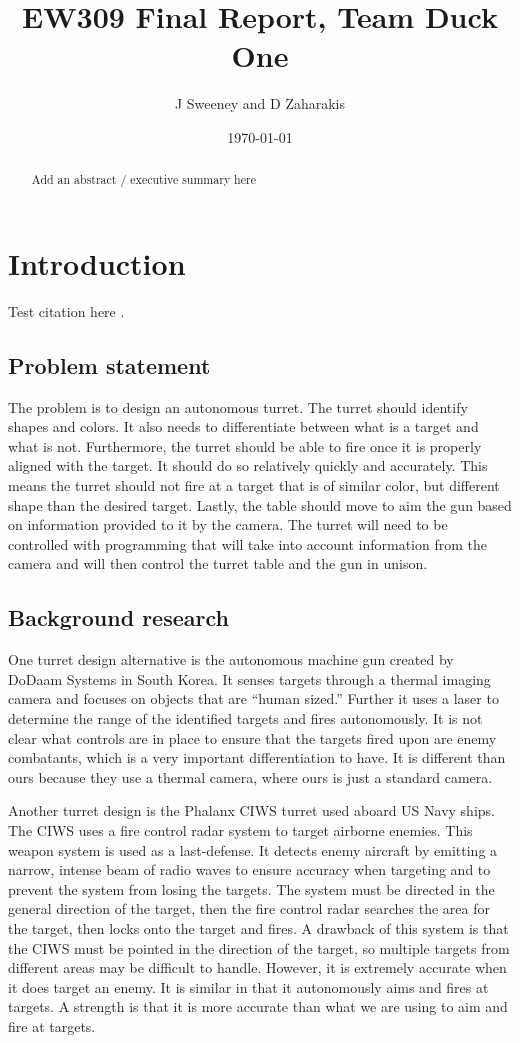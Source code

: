 \documentclass{article}
\title{EW309 Final Report, Team Duck One}
\author{J Sweeney and D Zaharakis}
\date{\today}
\begin{document}
\maketitle
\begin{abstract}
Add an abstract / executive summary here
\end{abstract}

\section{Introduction}
Test citation here \cite{buck2020go}.

\subsection{Problem statement}
The problem is to design an autonomous turret. The turret should identify shapes and colors. It also needs to differentiate between what is a target and what is not. Furthermore, the turret should be able to fire once it is properly aligned with the target. It should do so relatively quickly and accurately. This means the turret should not fire at a target that is of similar color, but different shape than the desired target. Lastly, the table should move to aim the gun based on information provided to it by the camera. The turret will need to be controlled with programming that will take into account information from the camera and will then control the turret table and the gun in unison. 

\subsection{Background research}
One turret design alternative is the autonomous machine gun created by DoDaam Systems in South Korea. It senses targets through a thermal imaging camera and focuses on objects that are “human sized.” Further it uses a laser to determine the range of the identified targets and fires autonomously. It is not clear what controls are in place to ensure that the targets fired upon are enemy combatants, which is a very important differentiation to have. It is different than ours because they use a thermal camera, where ours is just a standard camera.

Another turret design is the Phalanx CIWS turret used aboard US Navy ships. The CIWS uses a fire control radar system to target airborne enemies. This weapon system is used as a last-defense. It detects enemy aircraft by emitting a narrow, intense beam of radio waves to ensure accuracy when targeting and to prevent the system from losing the targets. The system must be directed in the general direction of the target, then the fire control radar searches the area for the target, then locks onto the target and fires. A drawback of this system is that the CIWS must be pointed in the direction of the target, so multiple targets from different areas may be difficult to handle. However, it is extremely accurate when it does target an enemy. It is similar in that it autonomously aims and fires at targets. A strength is that it is more accurate than what we are using to aim and fire at targets.
\end{document}

